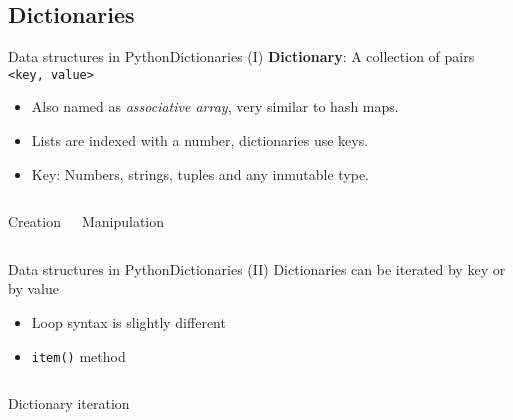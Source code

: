 \documentclass[10pt,compress]{beamer} %
\begin{document}
\subsection{Dictionaries}
\begin{frame}{Data structures in Python}{Dictionaries (I)}
	\textbf{Dictionary}: A collection of pairs \texttt{<key, value>}
		\begin{itemize}
		\item Also named as \textit{associative array}, very similar to hash maps.
		\item Lists are indexed with a number, dictionaries use keys.
		\item Key: Numbers, strings, tuples and any inmutable type.
		\end{itemize}

		\vspace{-0.3cm}
    \begin{columns}
		\begin{block}{Creation}
		\vspace{-0.2cm}
		
		\vspace{-0.2cm}
		\end{block}
		\vspace{0.7cm}

		\begin{block}{Manipulation}
		\vspace{-0.2cm}
		
		\vspace{-0.2cm}
		\end{block}

	\end{columns}
\end{frame}

\begin{frame}{Data structures in Python}{Dictionaries (II)}
	Dictionaries can be iterated by key or by value
		\begin{itemize}
		\item Loop syntax is slightly different
		\item \texttt{item()} method
		\end{itemize}

    \begin{columns}
		\begin{block}{Dictionary iteration}
		\vspace{-0.2cm}
		
		\vspace{-0.2cm}
		\end{block}
	\end{columns}
\end{frame}
\end{document}
